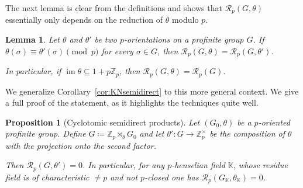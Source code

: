 \documentclass{amsart}
\newtheorem{prop}[thm]{Proposition}
\newtheorem{lem}[thm]{Lemma}
\theoremstyle{definition}
\theoremstyle{remark}
\DeclareMathOperator{\im}{im}
\newcommand{\KK}{\mathbb{K}}
\newcommand{\ZZ}{\mathbb{Z}}
\newcommand{\calR}{\mathcal{R}}
\begin{document}
The next lemma is clear from the definitions and shows that $\calR_p(G,\theta)$ essentially only depends on the reduction of $\theta$ modulo $p$.
\begin{lem}
    Let $\theta$ and $\theta'$ be two $p$-orientations on a profinite group $G$. If $\theta(\sigma)\equiv \theta'(\sigma)\pmod p$ for every $\sigma \in G$, then $\calR_p(G,\theta)=\calR_p(G,\theta')$.

    In particular, if $\im\theta\subseteq 1+p\ZZ_p$, then $\calR_p(G,\theta)=\calR_p(G)$.
\end{lem}
We generalize Corollary~\ref{cor:KNsemidirect} to this more general context. We give a full proof of the statement, as it highlights the techniques quite well.
\begin{prop}[Cyclotomic semidirect products]
    Let $(G_0,\theta)$ be a $p$-oriented profinite group. Define $G\coloneq \ZZ_p\rtimes_{\theta} G_0$ and let $\theta':G\to \ZZ_p^\times$ be the composition of $\theta$ with the projection onto the second factor. 

    Then $\calR_p(G,\theta')=0$. In particular, for any $p$-henselian field $\KK$, whose residue field is of characteristic $\neq p$ and not $p$-closed one has $\calR_p(G_{\KK},\theta_{\KK})=0$.
\end{prop}
\end{document}
